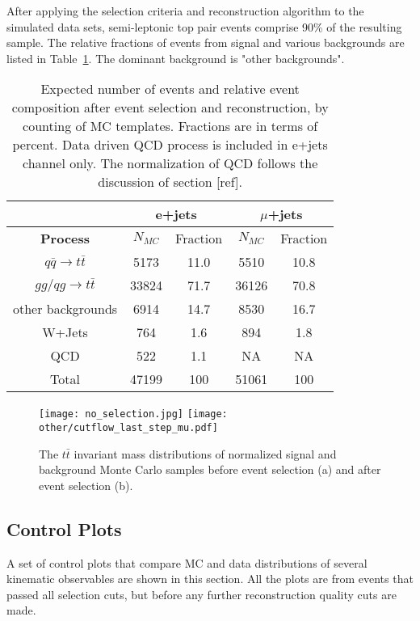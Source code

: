 \documentclass{cmspaperpdf}
\begin{document}
After applying the selection criteria and reconstruction algorithm to the simulated data sets, semi-leptonic top pair events comprise 90\% of the resulting sample. The relative fractions of events from signal and various backgrounds are listed in Table~\ref{tab:mc_fractions}. The dominant background is "other backgrounds". 

\begin{table}[h!]
\small
\centering
\begin{tabular}{|c | c  c | c  c|}
\hline
 & \multicolumn{2}{|c|}{e+jets}&\multicolumn{2}{|c|}{$\mu$+jets} \\
\hline
\textbf{Process} & $N_{MC}$ & Fraction & $N_{MC}$ & Fraction \\
\hline
$q\bar{q}\rightarrow t\bar{t}$ & 5173 & 11.0 & 5510 & 10.8 \\
$gg/qg\rightarrow t\bar{t}$ & 33824 & 71.7 & 36126 & 70.8 \\ 
other backgrounds & 6914 & 14.7 & 8530 & 16.7 \\ 
W+Jets & 764 & 1.6 & 894 & 1.8 \\
QCD &522 & 1.1 & NA & NA \\
Total & 47199 & 100 & 51061 & 100 \\
\hline
\end{tabular}
\caption{\small Expected number of events and relative event composition after event selection and reconstruction, by counting of MC templates. Fractions are in terms of percent. Data driven QCD process is included in e+jets channel only. The normalization of QCD follows the discussion of section [ref]. }
\label{tab:mc_fractions}

\end{table}

\begin{figure}[h!]
\texttt{[image: no\_selection.jpg]}
\texttt{[image: other/cutflow\_last\_step\_mu.pdf]}
\centering
\caption{\small \small The $t\bar{t}$ invariant mass distributions of normalized signal and background Monte Carlo samples before event selection (a) and after event selection (b). }
\label{tagging_results}
\end{figure}

\subsection{Control Plots}
A set of control plots that compare MC and data distributions of several kinematic observables are shown in this section. All the plots are from events that passed all selection cuts, but before any further reconstruction quality cuts are made. 
\end{document}
